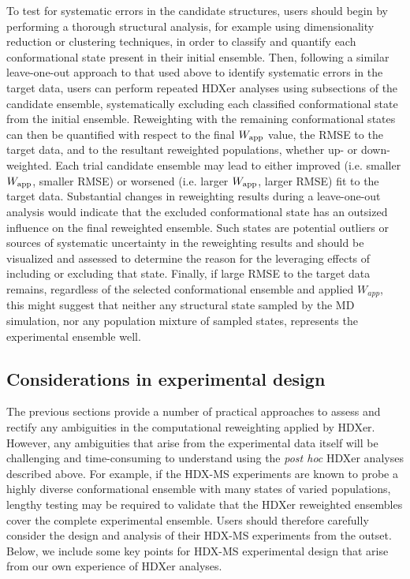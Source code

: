 \documentclass[9pt,tutorial,ASAPversion]{livecoms}
\begin{document}
To test for systematic errors in the candidate structures, users should begin by performing a thorough structural analysis, for example using dimensionality reduction or clustering techniques, in order to classify and quantify each conformational state present in their initial ensemble.
Then, following a similar leave-one-out approach to that used above to identify systematic errors in the target data, users can perform repeated HDXer analyses using subsections of the candidate ensemble, systematically excluding each classified conformational state from the initial ensemble. 
Reweighting with the remaining conformational states can then be quantified with respect to the final $W_{\textnormal{app}}$ value, the RMSE to the target data, and to the resultant reweighted populations, whether up- or down-weighted.
Each trial candidate ensemble may lead to either improved (i.e. smaller $W_{\textnormal{app}}$, smaller RMSE) or worsened (i.e. larger $W_{\textnormal{app}}$, larger RMSE) fit to the target data.
Substantial changes in reweighting results during a leave-one-out analysis would indicate that the excluded conformational state has an outsized influence on the final reweighted ensemble.
Such states are potential outliers or sources of systematic uncertainty in the reweighting results and should be visualized and assessed to determine the reason for the leveraging effects of including or excluding that state.
Finally, if large RMSE to the target data remains, regardless of the selected conformational ensemble and applied $W_{app}$, this might suggest that neither any structural state sampled by the MD simulation, nor any population mixture of sampled states, represents the experimental ensemble well.

\subsection{Considerations in experimental design}\label{expt_design_sect}
The previous sections provide a number of practical approaches to assess and rectify any ambiguities in the computational reweighting applied by HDXer.
However, any ambiguities that arise from the experimental data itself will be challenging and time-consuming to understand using the \textit{post hoc} HDXer analyses described above.
For example, if the HDX-MS experiments are known to probe a highly diverse conformational ensemble with many states of varied populations, lengthy testing may be required to validate that the HDXer reweighted ensembles cover the complete experimental ensemble.
Users should therefore carefully consider the design and analysis of their HDX-MS experiments from the outset.
Below, we include some key points for HDX-MS experimental design that arise from our own experience of HDXer analyses.
\end{document}
